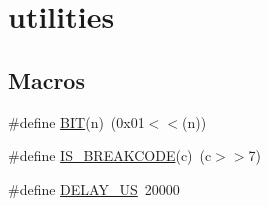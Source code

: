 \hypertarget{group__utilities}{}\section{utilities}
\label{group__utilities}
\subsection*{Macros}
\begin{DoxyCompactItemize}
\item 
\#define \hyperlink{group__utilities_ga3a8ea58898cb58fc96013383d39f482c}{B\+IT}(n)~(0x01$<$$<$(n))
\item 
\#define \hyperlink{group__utilities_gab2e0399a4e6f9f5eb241bade77f59ea1}{I\+S\+\_\+\+B\+R\+E\+A\+K\+C\+O\+DE}(c)~(c$>$$>$7)
\item 
\#define \hyperlink{group__utilities_ga1a522aa19bcb695a9df30032a893bee3}{D\+E\+L\+A\+Y\+\_\+\+US}~20000
\end{DoxyCompactItemize}
